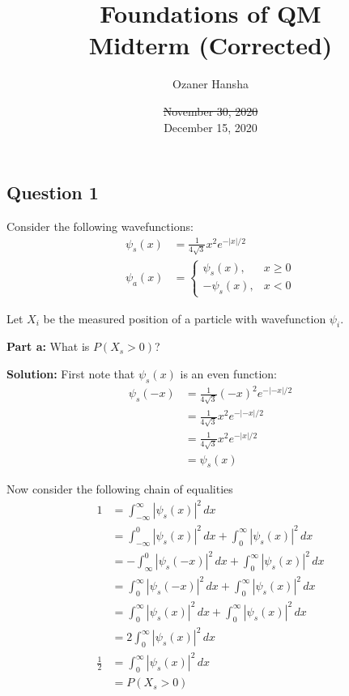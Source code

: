 \documentclass{article}
\begin{document}
\title{Foundations of QM\\ Midterm (Corrected)}
\author{Ozaner Hansha}
\date{\st{November 30, 2020}\\ December 15, 2020}
\maketitle

\subsection*{Question 1}
Consider the following wavefunctions:
\begin{align*}
    \psi_s(x)&=\frac{1}{4\sqrt{3}}x^2e^{-|x|/2}\\
    \psi_a(x)&=\begin{cases}
        \psi_s(x),&x\ge0\\
        -\psi_s(x),&x<0
    \end{cases}
\end{align*}

Let $X_i$ be the measured position of a particle with wavefunction $\psi_i$.
\bigskip

\noindent\textbf{Part a:} What is $P(X_s>0)$?
\bigskip

\noindent\textbf{Solution:} First note that $\psi_s(x)$ is an even function:
\begin{align*}
    \psi_s(-x)&=\frac{1}{4\sqrt{3}}(-x)^2e^{-|-x|/2}\tag{def. of $\psi_s$}\\
    &=\frac{1}{4\sqrt{3}}x^2e^{-|-x|/2}\tag{$x^2=(-x)^2$}\\
    &=\frac{1}{4\sqrt{3}}x^2e^{-|x|/2}\tag{$|x|=|-x|$}\\
    &=\psi_s(x)\tag{def. of $\psi_s$}
\end{align*}

Now consider the following chain of equalities
\begin{align*}
    1&=\int_{-\infty}^\infty|\psi_s(x)|^2\,dx\tag{integral of a pdf over support is 1}\\
    &=\int_{-\infty}^0|\psi_s(x)|^2\,dx+\int_0^\infty|\psi_s(x)|^2\,dx\\
    &=-\int_{\infty}^0|\psi_s(-x)|^2\,dx+\int_0^{\infty}|\psi_s(x)|^2\,dx\tag{expansion of interval of integration by $-1$}\\
    &=\int^{\infty}_0|\psi_s(-x)|^2\,dx+\int_0^{\infty}|\psi_s(x)|^2\,dx\tag{reverse interval of integration}\\
    &=\int^{\infty}_0|\psi_s(x)|^2\,dx+\int_0^{\infty}|\psi_s(x)|^2\,dx\tag{$\psi_s$ is an even function}\\
    &=2\int^{\infty}_0|\psi_s(x)|^2\,dx\\
    \frac{1}{2}&=\int^{\infty}_0|\psi_s(x)|^2\,dx\\
    &=P(X_s>0)
\end{align*}
\end{document}
